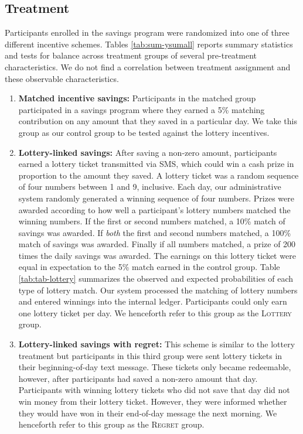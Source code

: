 \documentclass[12pt]{article}
\begin{document}
	\subsection{Treatment} \label{sec:treat}

		Participants enrolled in the savings program were randomized into one of three different incentive schemes. Tables \ref{tab:sum-ysumall} reports summary statistics and tests for balance across treatment groups of several pre-treatment characteristics. We do not find a correlation between treatment assignment and these observable characteristics.

		\begin{enumerate}

			\item \textbf{Matched incentive savings:} Participants in the matched group participated in a savings program where they earned a 5\% matching contribution on any amount that they saved in a particular day. We take this group as our control group to be tested against the lottery incentives.

			\item \textbf{Lottery-linked savings:} After saving a non-zero amount, participants earned a lottery ticket transmitted via SMS, which could win a cash prize in proportion to the amount they saved. A lottery ticket was a random sequence of four numbers between 1 and 9, inclusive. Each day, our administrative system randomly generated a winning sequence of four numbers. Prizes were awarded according to how well a participant's lottery numbers matched the winning numbers. If the first or second numbers matched, a 10\% match of savings was awarded. If \emph{both} the first and second numbers matched, a 100\% match of savings was awarded. Finally if all numbers matched, a prize of 200 times the daily savings was awarded. The earnings on this lottery ticket were equal in expectation to the 5\% match earned in the control group. Table \ref{tab:tab-lottery} summarizes the observed and expected probabilities of each type of lottery match. Our system processed the matching of lottery numbers and entered winnings into the internal ledger. Participants could only earn one lottery ticket per day. We henceforth refer to this group as the \textsc{Lottery} group.

			\item \textbf{Lottery-linked savings with regret:} This scheme is similar to the lottery treatment but participants in this third group were sent lottery tickets in their beginning-of-day text message. These tickets only became redeemable, however, after participants had saved a non-zero amount that day. Participants with winning lottery tickets who did not save that day did not win money from their lottery ticket. However, they were informed whether they would have won in their end-of-day message the next morning. We henceforth refer to this group as the \textsc{Regret} group.

		\end{enumerate}
\end{document}

